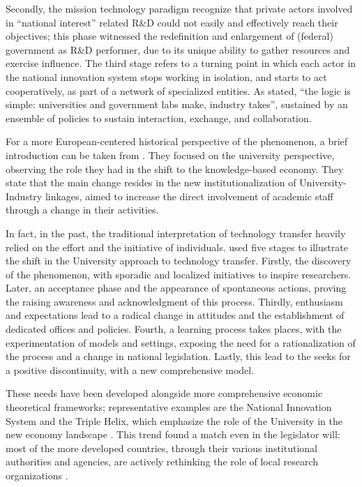 Secondly, the mission technology paradigm recognize that private actors involved in \enquote{national interest} related R\&D could not easily and effectively reach their objectives; this phase witnessed the redefinition and enlargement of (federal) government as R\&D performer, due to its unique ability to gather resources and exercise influence. The third stage refers to a turning point in which each actor in the national innovation system stops working in isolation, and starts to act cooperatively, as part of a network of specialized entities. As stated, \enquote{the logic is simple: universities and government labs make, industry takes}, sustained by an ensemble of policies to sustain interaction, exchange, and collaboration. 

For a more European-centered historical perspective of the phenomenon, a brief introduction can be taken from \citet{Geuna2009}. They focused on the university perspective, observing the role they had in the shift to the knowledge-based economy. They state that the main change resides in the new institutionalization of University-Industry linkages, aimed to increase the direct involvement of academic staff through a change in their activities.

In fact, in the past, the traditional interpretation of technology transfer heavily relied on the effort and the initiative of individuals. \citet{Balderi2007} used five stages to illustrate the shift in the University approach to technology transfer. Firstly, the discovery of the phenomenon, with sporadic and localized initiatives to inspire researchers. Later, an acceptance phase and the appearance of spontaneous actions, proving the raising awareness and acknowledgment of this process. Thirdly, enthusiasm and expectations lead to a radical change in attitudes and the establishment of dedicated offices and policies. Fourth, a learning process takes places, with the experimentation of models and settings, exposing the need for a rationalization of the process and a change in national legislation. Lastly, this lead to the seeks for a positive discontinuity, with a new comprehensive model.

These needs have been developed alongside more comprehensive economic theoretical frameworks; representative examples are the National Innovation System and the Triple Helix, which emphasize the role of the University in the new economy landscape \citep{Balderi2007}. This trend found a match even in the legislator will: most of the more developed countries, through their various institutional authorities and agencies, are actively rethinking the role of local research organizations \citep{Geuna2009}.

